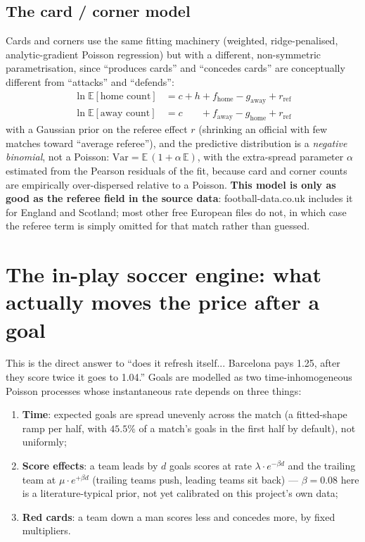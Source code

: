 \documentclass[11pt]{article}
\begin{document}
\subsection{The card / corner model}
Cards and corners use the same fitting machinery (weighted, ridge-penalised, analytic-gradient
Poisson regression) but with a different, non-symmetric parametrisation, since ``produces cards''
and ``concedes cards'' are conceptually different from ``attacks'' and ``defends'':
\begin{align}
\ln \mathbb E[\text{home count}] &= c + h + f_{\text{home}} - g_{\text{away}} + r_{\text{ref}}\\
\ln \mathbb E[\text{away count}] &= c \phantom{{}+h{}} + f_{\text{away}} - g_{\text{home}} + r_{\text{ref}}
\end{align}
with a Gaussian prior on the referee effect $r$ (shrinking an official with few matches toward
``average referee''), and the predictive distribution is a \emph{negative binomial}, not a
Poisson: $\mathrm{Var} = \mathbb E\,(1+\alpha\,\mathbb E)$, with the extra-spread parameter
$\alpha$ estimated from the Pearson residuals of the fit, because card and corner counts are
empirically over-dispersed relative to a Poisson. \textbf{This model is only as good as the
referee field in the source data}: football-data.co.uk includes it for England and Scotland;
most other free European files do not, in which case the referee term is simply omitted for that
match rather than guessed.

\section{The in-play soccer engine: what actually moves the price after a goal}
\label{sec:inplay}
This is the direct answer to ``does it refresh itself... Barcelona pays 1.25, after they score
twice it goes to 1.04.'' Goals are modelled as two time-inhomogeneous Poisson processes whose
instantaneous rate depends on three things:

\begin{enumerate}[leftmargin=1.4em]
\item \textbf{Time}: expected goals are spread unevenly across the match (a fitted-shape ramp per
half, with $45.5\%$ of a match's goals in the first half by default), not uniformly;
\item \textbf{Score effects}: a team leads by $d$ goals scores at rate $\lambda\cdot e^{-\beta d}$
and the trailing team at $\mu\cdot e^{+\beta d}$ (trailing teams push, leading teams sit back) ---
$\beta=0.08$ here is a literature-typical prior, not yet calibrated on this project's own data;
\item \textbf{Red cards}: a team down a man scores less and concedes more, by fixed multipliers.
\end{enumerate}
\end{document}

